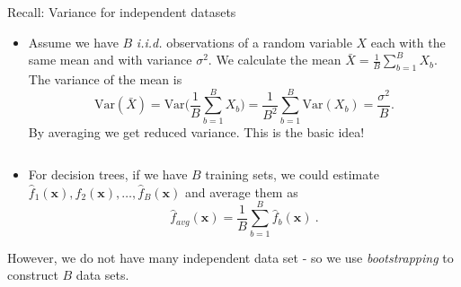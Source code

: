 \documentclass[
  10pt,
  ignorenonframetext,
]{beamer}
\providecommand{\tightlist}{%
  \setlength{\itemsep}{0pt}\setlength{\parskip}{0pt}}
\begin{document}
\begin{frame}
\begin{block}{Recall: Variance for independent datasets}
\protect\hypertarget{recall-variance-for-independent-datasets}{}
\vspace{2mm}

\begin{itemize}
\tightlist
\item
  Assume we have \(B\) \emph{i.i.d.} observations of a random variable
  \(X\) each with the same mean and with variance \(\sigma^2\). We
  calculate the mean \(\bar{X} = \frac{1}{B} \sum_{b=1}^B X_b\). The
  variance of the mean is
  \[\text{Var}(\bar{X}) = \text{Var}\Big(\frac{1}{B}\sum_{b=1}^B X_b \Big) = \frac{1}{B^2} \sum_{b=1}^B \text{Var}(X_b) = \frac{\sigma^2}{B}.\]
  By averaging we get reduced variance. This is the basic idea!
\end{itemize}

\(~\)

\begin{itemize}
\tightlist
\item
  For decision trees, if we have \(B\) training sets, we could estimate
  \(\hat{f}_1({\boldsymbol x}),\hat{f}_2({\boldsymbol x}),\ldots, \hat{f}_B({\boldsymbol x})\)
  and average them as
  \[ \hat{f}_{avg}({\boldsymbol x})=\frac{1}{B}\sum_{b=1}^B \hat{f}_b({\boldsymbol x}) \ .\]
\end{itemize}

However, we do not have many independent data set - so we use
\emph{bootstrapping} to construct \(B\) data sets.
\end{block}
\end{frame}
\end{document}
